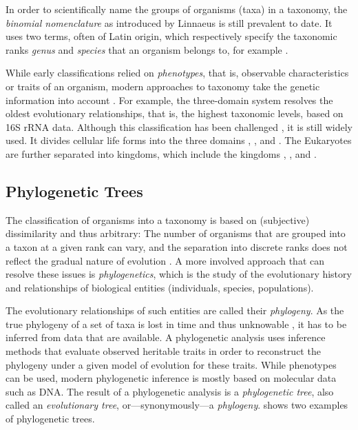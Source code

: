 In order to scientifically name the groups of organisms (taxa) in a taxonomy,
the \emph{binomial nomenclature} as introduced by Linnaeus is still prevalent to date.
It uses two terms, often of Latin origin,
which respectively specify the taxonomic ranks \emph{genus} and \emph{species} that an organism belongs to,
for example .

While early classifications relied on \emph{phenotypes}, that is, observable characteristics or traits of an organism,
modern approaches to taxonomy take the genetic information into account \cite{Mayr2002}.
For example, the three-domain system \cite{Woese1977,Woese1990} resolves the oldest evolutionary relationships,
that is, the highest taxonomic levels, based on 16S rRNA data.
Although this classification has been challenged \cite{Gupta1998,Mayr1998,Cavalier-Smith2002}, it is still widely used.
It divides cellular life forms into the three domains , , and .
The Eukaryotes are further separated into kingdoms,
which include the kingdoms , , and .



\subsection{Phylogenetic Trees}
\label{ch:Foundations:sec:TreeOfLife:sub:PhylogeneticTrees}

The classification of organisms into a taxonomy is based on (subjective) dissimilarity and thus arbitrary:
The number of organisms that are grouped into a taxon at a given rank can vary,
and the separation into discrete ranks does not reflect the gradual nature of evolution \cite{Gingerich1987}.
A more involved approach that can resolve these issues is \emph{phylogenetics},
which is the study of the evolutionary history and relationships of biological entities (individuals, species, populations).

The evolutionary relationships of such entities are called their \emph{phylogeny}.
As the true phylogeny of a set of taxa is lost in time and thus unknowable \cite{Haber2005},
it has to be inferred from data that are available.
A phylogenetic analysis uses inference methods that evaluate observed heritable traits
in order to reconstruct the phylogeny under a given model of evolution for these traits.
While phenotypes can be used, modern phylogenetic inference is mostly based on molecular data such as DNA.
The result of a phylogenetic analysis is a \emph{phylogenetic tree},
also called an \emph{evolutionary tree}, or---synonymously---a \emph{phylogeny}.
 shows two examples of phylogenetic trees.

